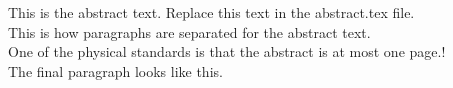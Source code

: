 \large
{\parindent0pt 
This is the abstract text.  Replace this text in the abstract.tex file.\\

This is how paragraphs are separated for the abstract text.\\

One of the physical standards is that the abstract is at most one page.!\\

The final paragraph looks like this.
}